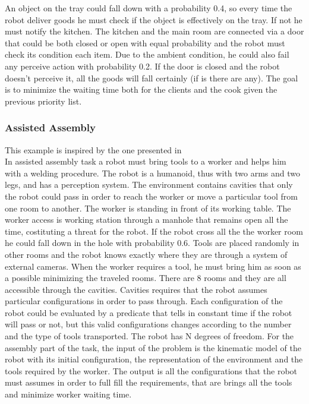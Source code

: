 \documentclass[pdftex,12pt,a4paper]{report}
\begin{document}
\noindent  An object on the tray could fall down with a probability 0.4, so every time the robot deliver goods he must check if the object is effectively on the tray. If not he must notify the kitchen. The kitchen and the main room are connected via a door that could be both closed or open with equal probability and the robot must check its condition each item. Due to the ambient condition, he could also fail any perceive action with probability 0.2. If the door is closed and the robot doesn't perceive it, all the goods will fall certainly (if is there are any). The goal is to minimize the waiting time both for the clients and the cook given the previous priority list.

\subsubsection{Assisted Assembly}
This example is inspired by the one presented in \cite{alami2014human} \\ %
In assisted assembly task a robot must bring tools to a worker and helps him with a welding procedure. The robot is a humanoid, thus with two arms and two legs, and has a perception system. The environment contains cavities that only the robot could pass in order to reach the worker or move a particular tool from one room to another. The worker is standing in front of its working table. 
The worker access is working station through a manhole that remains open all the time, costituting a threat for the robot. If the robot cross all the the worker room he could fall down in the hole with probability 0.6.
Tools are placed randomly in other rooms and the robot knows exactly where they are through a system of external cameras. When the worker requires a tool, he must bring him as soon as a possible minimizing the traveled rooms. There are 8 rooms and they are all accessible through the cavities. Cavities requires that the robot assumes particular configurations in order to pass through. Each configuration of the robot could be evaluated by a predicate that tells in constant time if the robot will pass or not, but this valid configurations changes according to the number and the type of tools transported. The robot has N degrees of freedom. For the assembly part of the task, the input of the problem is the kinematic model of the robot with its initial configuration, the representation of the environment and the tools required by the worker. The output is all the configurations that the robot must assumes in order to full fill the requirements, that are brings all the tools and minimize worker waiting time. \\
\end{document}
